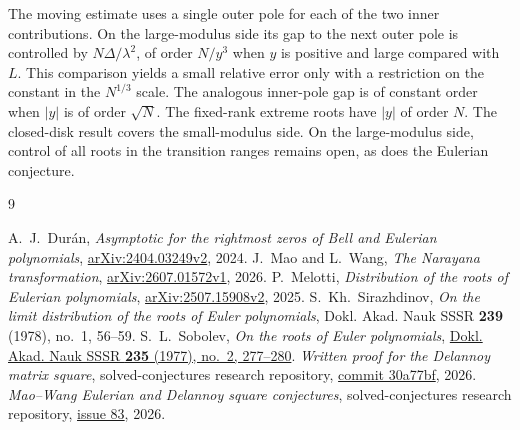 \documentclass[11pt]{article}
\begin{document}
The moving estimate uses a single outer pole for each of the two inner contributions. On the large-modulus side its gap to the next outer pole is controlled by \(N\Delta/\lambda^2\), of order \(N/y^3\) when \(y\) is positive and large compared with \(L\). This comparison yields a small relative error only with a restriction on the constant in the \(N^{1/3}\) scale. The analogous inner-pole gap is of constant order when \(|y|\) is of order \(\sqrt N\). The fixed-rank extreme roots have \(|y|\) of order \(N\). The closed-disk result covers the small-modulus side. On the large-modulus side, control of all roots in the transition ranges remains open, as does the Eulerian conjecture.

\begin{thebibliography}{9}
\raggedright
{}
A.~J.~Dur\'an, \emph{Asymptotic for the rightmost zeros of Bell and Eulerian polynomials},
\href{https://arxiv.org/abs/2404.03249v2}{arXiv:2404.03249v2}, 2024.
J.~Mao and L.~Wang, \emph{The Narayana transformation},
\href{https://arxiv.org/pdf/2607.01572v1}{arXiv:2607.01572v1}, 2026.
P.~Melotti, \emph{Distribution of the roots of Eulerian polynomials},
\href{https://arxiv.org/abs/2507.15908v2}{arXiv:2507.15908v2}, 2025.
S.~Kh.~Sirazhdinov, \emph{On the limit distribution of the roots of Euler polynomials},
Dokl. Akad. Nauk SSSR \textbf{239} (1978), no.~1, 56--59.
S.~L.~Sobolev, \emph{On the roots of Euler polynomials},
\href{https://www.mathnet.ru/eng/dan/v235/i2/p277}{Dokl. Akad. Nauk SSSR \textbf{235} (1977), no.~2, 277--280}.
\emph{Written proof for the Delannoy matrix square},
solved-conjectures research repository,
\href{https://github.com/1337isnot1337/solved-conjectures/blob/30a77bf/research/mao-wang/delannoy-proof.md}{commit 30a77bf}, 2026.
\emph{Mao--Wang Eulerian and Delannoy square conjectures},
solved-conjectures research repository,
\href{https://github.com/1337isnot1337/solved-conjectures/issues/83}{issue 83}, 2026.
\end{thebibliography}
\end{document}
